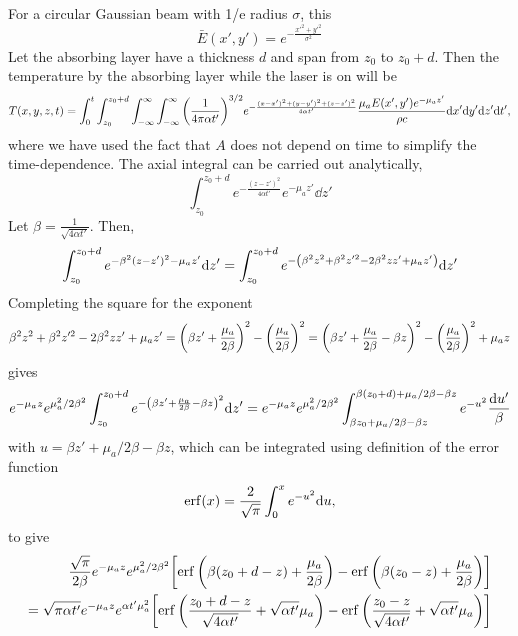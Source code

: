\documentclass[]{article}
\begin{document}
For a circular Gaussian beam with 1/e radius $\sigma$, this
\begin{equation*}
    \bar{E}(x',y') = e^{-\frac{x'^2 + y'^2}{\sigma^2}}
\end{equation*}
Let the absorbing layer have a thickness $d$ and span from $z_0$ to $z_0 + d$. Then the temperature
by the absorbing layer while the laser is on will be
\begin{equation*}
  T(x,y,z,t) = \int_0^t \int_{z_0}^{z_0 + d} \int_{-\infty}^{\infty} \int_{-\infty}^{\infty} \qty(\frac{1}{4\pi \alpha t'})^{3/2} e^{-\frac{(x-x')^2+(y-y')^2+(z-z')^2}{4\alpha t'}} \frac{\mu_a E(x',y') e^{-\mu_a z'}}{\rho c} \dd x' \dd y' \dd z' \dd t',
\end{equation*}
where we have used the fact that $A$ does not depend on time to simplify the time-dependence.
The axial integral can be carried out analytically,
\begin{equation*}
    \int_{z_0}^{z_0 + d} e^{-\frac{(z-z')^2}{4\alpha t'}} e^{-\mu_a z'} \dd z'
\end{equation*}
Let $\beta = \frac{1}{\sqrt{4 \alpha t'}}$. Then,
\begin{equation*}
    \int_{z_0}^{z_0 + d} e^{-\beta^2 (z-z')^2-\mu_a z'} \dd z' =
    \int_{z_0}^{z_0 + d} e^{-\qty(\beta^2 z^2 + \beta^2z'^2 -2\beta^2zz'+\mu_a z')} \dd z'
\end{equation*}
Completing the square for the exponent
\begin{equation*}
  \beta^2 z^2 + \beta^2 z'^2 -2\beta^2 z z' + \mu_a z' = \qty(\beta z' + \frac{\mu_a}{2\beta})^2 - \qty(\frac{\mu_a}{2\beta})^2 = \qty(\beta z' + \frac{\mu_a}{2\beta} - \beta z)^2 - \qty(\frac{\mu_a}{2\beta})^2  + \mu_a z
\end{equation*}
gives
\begin{align*}
  e^{-\mu_a z} e^{\mu_a^2/2\beta^2}\int_{z_0}^{z_0 + d} e^{-\qty(\beta z' + \frac{\mu_a}{2\beta} - \beta z)^2} \dd z'
= e^{-\mu_a z} e^{\mu_a^2/2\beta^2}\int_{\beta z_0 + \mu_a/2\beta - \beta z}^{\beta(z_0 + d) + \mu_a/2\beta - \beta z} e^{-u^2} \frac{\dd u'}{\beta}
\end{align*}
with $u = \beta z' + \mu_a/2\beta - \beta z$, which can be integrated using definition of the error function
\begin{equation*}
  \erf(x) = \frac{2}{\sqrt{\pi}} \int_0^x e^{-u^2} \dd u,
\end{equation*}
to give
\begin{align*}
  \frac{\sqrt{\pi}}{2\beta} e^{-\mu_a z} e^{\mu_a^2/2\beta^2}\qty[\erf\qty(\beta(z_0 + d - z) + \frac{\mu_a}{2\beta} ) - \erf\qty(\beta(z_0 - z) + \frac{\mu_a}{2\beta}) ] \\
  = \sqrt{\pi\alpha t'} e^{-\mu_a z} e^{\alpha t'\mu_a^2}\qty[\erf\qty(\frac{z_0 + d - z}{\sqrt{4\alpha t'}} + \sqrt{\alpha t'}\mu_a ) - \erf\qty(\frac{z_0 - z}{\sqrt{4\alpha t'}} + \sqrt{\alpha t'}\mu_a ) ]
\end{align*}
\end{document}

